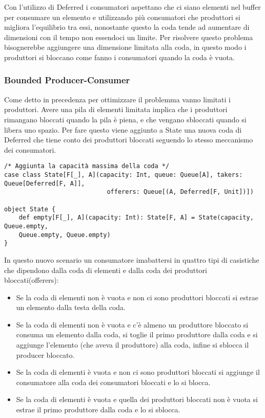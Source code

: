 \noindent Con l’utilizzo di Deferred i consumatori aspettano che ci siano elementi nel buffer per consumare un elemento e utilizzando più consumatori che produttori si migliora l’equilibrio tra essi, nonostante questo la coda tende ad aumentare di dimensioni con il tempo non essendoci un limite. Per risolvere questo problema bisognerebbe aggiungere una dimensione limitata alla coda, in questo modo i produttori si bloccano come fanno i consumatori quando la coda è vuota.

\subsubsection{Bounded Producer-Consumer}
Come detto in precedenza per ottimizzare il problemma vanno limitati i produttori. Avere una pila di elementi limitata implica che i produttori rimangano bloccati quando la pila è piena, e che vengano sbloccati quando si libera uno spazio. Per fare questo viene aggiunto a State una nuova coda di Deferred che tiene conto dei produttori bloccati seguendo lo stesso meccanismo dei consumatori.

\begin{verbatim}
/* Aggiunta la capacità massima della coda */
case class State[F[_], A](capacity: Int, queue: Queue[A], takers: Queue[Deferred[F, A]],
                            offerers: Queue[(A, Deferred[F, Unit])])

object State {
    def empty[F[_], A](capacity: Int): State[F, A] = State(capacity, Queue.empty,
    Queue.empty, Queue.empty)
}
\end{verbatim}

\noindent In questo nuovo scenario un consumatore imabattersi in quattro tipi di casistiche che dipendono dalla coda di elementi e dalla coda dei produttori bloccati(offerers):

\begin{itemize}
    \item Se la coda di elementi non è vuota e non ci sono produttori bloccati si estrae un elemento dalla testa della coda.
    \item Se la coda di elementi non è vuota e c’è almeno un produttore bloccato si consuma un elemento dalla coda, si toglie il primo produttore dalla coda e si aggiunge l’elemento (che aveva il produttore) alla coda, infine si sblocca il producer bloccato.
    \item Se la coda di elementi è vuota e non ci sono produttori bloccati si aggiunge il consumatore alla coda dei consumatori bloccati e lo si blocca.
    \item Se la coda di elementi è vuota e quella dei produttori bloccati non è vuota si estrae il primo produttore dalla coda e lo si sblocca.
\end{itemize}

